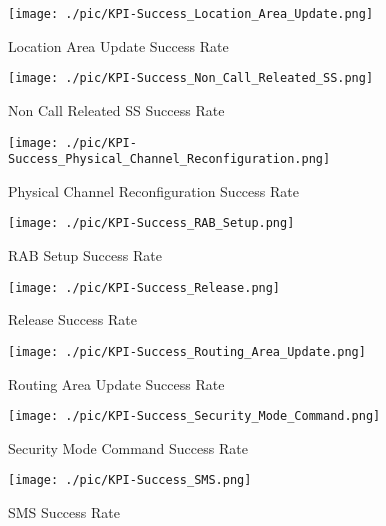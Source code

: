 \clearpage
\vfill
\begin{figure}[H]\centering
\texttt{[image: ./pic/KPI-Success\_Location\_Area\_Update.png]}
\caption{Location Area Update Success Rate}
\end{figure}
\vfill

\clearpage
\vfill
\begin{figure}[H]\centering
\texttt{[image: ./pic/KPI-Success\_Non\_Call\_Releated\_SS.png]}
\caption{Non Call Releated SS Success Rate}
\end{figure}
\vfill

\clearpage
\vfill
\begin{figure}[H]\centering
\texttt{[image: ./pic/KPI-Success\_Physical\_Channel\_Reconfiguration.png]}
\caption{Physical Channel Reconfiguration Success Rate}
\end{figure}
\vfill

\clearpage
\vfill
\begin{figure}[H]\centering
\texttt{[image: ./pic/KPI-Success\_RAB\_Setup.png]}
\caption{RAB Setup Success Rate}
\end{figure}
\vfill

\clearpage
\vfill
\begin{figure}[H]\centering
\texttt{[image: ./pic/KPI-Success\_Release.png]}
\caption{Release Success Rate}
\end{figure}
\vfill

\clearpage
\vfill
\begin{figure}[H]\centering
\texttt{[image: ./pic/KPI-Success\_Routing\_Area\_Update.png]}
\caption{Routing Area Update Success Rate}
\end{figure}
\vfill

\clearpage
\vfill
\begin{figure}[H]\centering
\texttt{[image: ./pic/KPI-Success\_Security\_Mode\_Command.png]}
\caption{Security Mode Command Success Rate}
\end{figure}
\vfill

\clearpage
\vfill
\begin{figure}[H]\centering
\texttt{[image: ./pic/KPI-Success\_SMS.png]}
\caption{SMS Success Rate}
\end{figure}
\vfill







